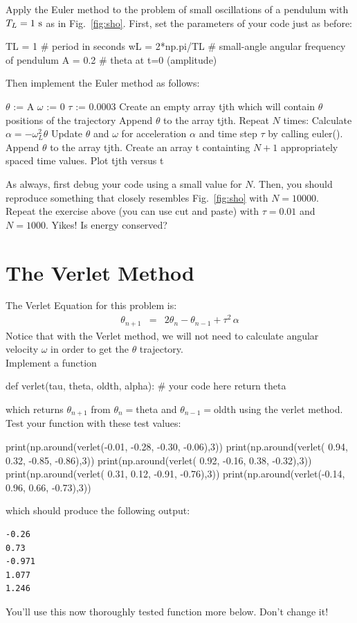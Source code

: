\plot  Apply the Euler method to the problem of small oscillations of a pendulum with $T_L=1~\rm s$ as in Fig.~\ref{fig:sho}.  First, set the parameters of your code just as before:
\begin{python}
TL = 1          # period in seconds 
wL = 2*np.pi/TL # small-angle angular frequency of pendulum 
A  = 0.2        # theta at t=0 (amplitude)
\end{python}
Then implement the Euler method as follows:
\begin{algorithm}
  $\theta$ := A
  $\omega$ := 0
  $\tau$ := 0.0003
  Create an empty array tjth which will contain $\theta$ positions of the trajectory
  Append $\theta$ to the array tjth.
  Repeat $N$ times:
     Calculate $\alpha = -\omega_L^2 \theta$
     Update $\theta$ and $\omega$ for acceleration $\alpha$ and time step $\tau$ by calling euler().
     Append $\theta$ to the array tjth.
  Create an array t containting $N+1$ appropriately spaced time values.
  Plot tjth versus t
\end{algorithm} 
As always, first debug your code using a small value for $N$.  Then,
you should reproduce something that closely resembles Fig.~\ref{fig:sho} with
$N=10000$. \\

\plot Repeat the exercise above (you can use cut and paste) with $\tau=0.01$ and $N=1000$.  Yikes!  Is energy conserved?\\

\section{The Verlet Method}

The Verlet Equation for this problem is:
\begin{eqnarray}
  \theta_{n+1} &=& 2 \theta_n - \theta_{n-1} + \tau^2 \, \alpha
\end{eqnarray}
Notice that with the Verlet method, we will not need to calculate angular
velocity $\omega$ in order to get the $\theta$ trajectory.\\

\plot Implement a function
\begin{python}
def verlet(tau, theta, oldth, alpha):
   # your code here
   return theta
\end{python}
which returns $\theta_{n+1}$ from $\theta_n=$theta and
$\theta_{n-1}=$oldth using the verlet method.
Test your  function with these test values:
\begin{python}
print(np.around(verlet(-0.01, -0.28, -0.30, -0.06),3))
print(np.around(verlet( 0.94,  0.32, -0.85, -0.86),3))
print(np.around(verlet( 0.92, -0.16,  0.38, -0.32),3))
print(np.around(verlet( 0.31,  0.12, -0.91, -0.76),3))
print(np.around(verlet(-0.14,  0.96,  0.66, -0.73),3))
\end{python}
which should produce the following output:
\begin{verbatim}
-0.26
0.73
-0.971
1.077
1.246
\end{verbatim}
You'll use this now thoroughly tested function more below.  Don't change it!\\

